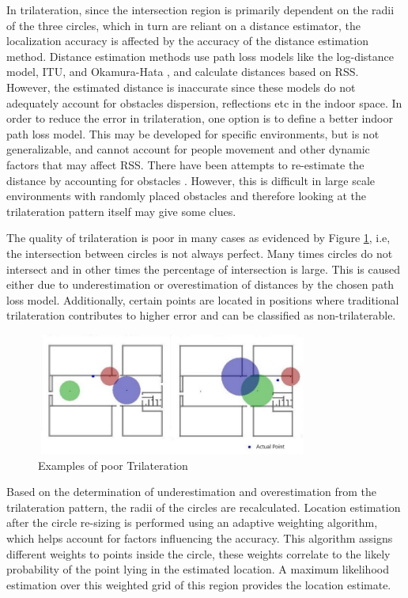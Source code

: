 \documentclass[twocolumn]{svjour3}
\begin{document}
In trilateration, since the intersection region is primarily dependent on the radii of the three circles, which in turn are reliant on a distance estimator, the localization accuracy is affected by the accuracy of the distance estimation method. Distance estimation methods use path loss models like the log-distance model, ITU, and Okamura-Hata \citep*{soorty2015finding}, and calculate distances based on RSS. However, the estimated distance is inaccurate since these models do not adequately account for obstacles dispersion, reflections etc in the indoor space. In order to reduce the error in trilateration, one option is to define a better indoor path loss model. This may be developed for specific environments, but is not generalizable, and cannot account for people movement and other dynamic factors that may affect RSS. There have been attempts to re-estimate the distance by accounting for obstacles \citep*{chandrasekaran2015inplace}. However, this is difficult in large scale environments with randomly placed obstacles and therefore looking at the trilateration pattern itself may give some clues.

The quality of trilateration is poor in many cases as evidenced by Figure \ref{fig:intro}, i.e, the intersection between circles is not always perfect. Many times circles do not intersect and in other times the percentage of intersection is large. This is caused either due to underestimation or overestimation of distances by the chosen path loss model. Additionally, certain points are located in positions where traditional trilateration contributes to higher error and can be classified as non-trilaterable.

\begin{figure}[!ht]
\centering
\includegraphics[width=90mm,height=40mm]{Intro_1.jpeg}
\centering\caption{Examples of poor Trilateration}
\label{fig:intro}
\end{figure}

Based on the determination of underestimation and overestimation from the trilateration pattern, the radii of the circles are recalculated. Location estimation after the circle re-sizing is performed using an adaptive weighting algorithm, which helps account for factors influencing the accuracy. This algorithm assigns different weights to points inside the circle, these weights correlate to the likely probability of the point lying in the estimated location. A maximum likelihood estimation over this weighted grid of this region provides the location estimate. 
\end{document}
